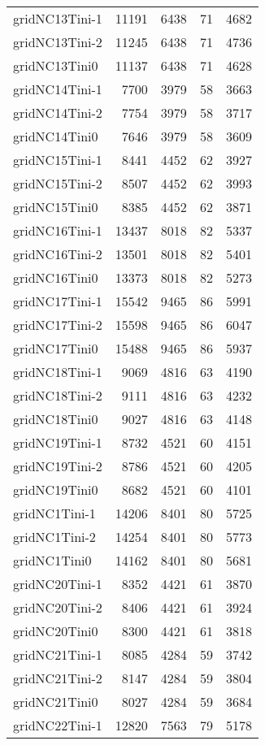 \begin{longtable}{lrrrr}
gridNC13Tini-1 & 11191 & 6438 & 71 & 4682 \\
gridNC13Tini-2 & 11245 & 6438 & 71 & 4736 \\
gridNC13Tini0 & 11137 & 6438 & 71 & 4628 \\
gridNC14Tini-1 & 7700 & 3979 & 58 & 3663 \\
gridNC14Tini-2 & 7754 & 3979 & 58 & 3717 \\
gridNC14Tini0 & 7646 & 3979 & 58 & 3609 \\
gridNC15Tini-1 & 8441 & 4452 & 62 & 3927 \\
gridNC15Tini-2 & 8507 & 4452 & 62 & 3993 \\
gridNC15Tini0 & 8385 & 4452 & 62 & 3871 \\
gridNC16Tini-1 & 13437 & 8018 & 82 & 5337 \\
gridNC16Tini-2 & 13501 & 8018 & 82 & 5401 \\
gridNC16Tini0 & 13373 & 8018 & 82 & 5273 \\
gridNC17Tini-1 & 15542 & 9465 & 86 & 5991 \\
gridNC17Tini-2 & 15598 & 9465 & 86 & 6047 \\
gridNC17Tini0 & 15488 & 9465 & 86 & 5937 \\
gridNC18Tini-1 & 9069 & 4816 & 63 & 4190 \\
gridNC18Tini-2 & 9111 & 4816 & 63 & 4232 \\
gridNC18Tini0 & 9027 & 4816 & 63 & 4148 \\
gridNC19Tini-1 & 8732 & 4521 & 60 & 4151 \\
gridNC19Tini-2 & 8786 & 4521 & 60 & 4205 \\
gridNC19Tini0 & 8682 & 4521 & 60 & 4101 \\
gridNC1Tini-1 & 14206 & 8401 & 80 & 5725 \\
gridNC1Tini-2 & 14254 & 8401 & 80 & 5773 \\
gridNC1Tini0 & 14162 & 8401 & 80 & 5681 \\
gridNC20Tini-1 & 8352 & 4421 & 61 & 3870 \\
gridNC20Tini-2 & 8406 & 4421 & 61 & 3924 \\
gridNC20Tini0 & 8300 & 4421 & 61 & 3818 \\
gridNC21Tini-1 & 8085 & 4284 & 59 & 3742 \\
gridNC21Tini-2 & 8147 & 4284 & 59 & 3804 \\
gridNC21Tini0 & 8027 & 4284 & 59 & 3684 \\
gridNC22Tini-1 & 12820 & 7563 & 79 & 5178 \\

\end{longtable}
